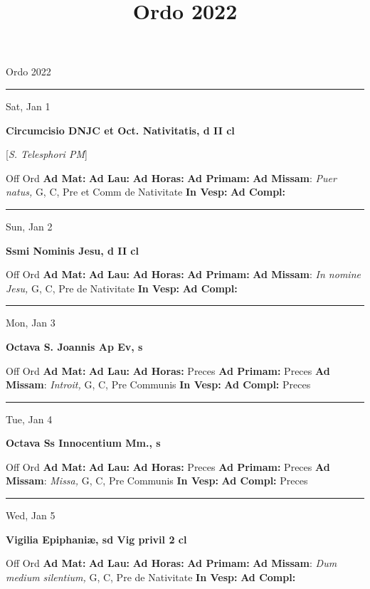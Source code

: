 \documentclass[letterpaper, 10pt]{article}
\title{Ordo 2022}
\begin{document}
\begin{center}
\Huge Ordo 2022\end{center}

\hrule
\begin{center}
Sat, Jan 1
\end{center}\textbf{ \large Circumcisio DNJC et Oct. Nativitatis, \textnormal{\normalsize d II cl}}

[\textit{S. Telesphori PM}]
\begin{justify}
Off Ord
\textbf{Ad Mat: }
\textbf{Ad Lau: }
\textbf{Ad Horas: }
\textbf{Ad Primam: }
\textbf{Ad Missam}: \textit{Puer natus,} G, C, Pre et Comm de Nativitate
\textbf{In Vesp: }
\textbf{Ad Compl: }\end{justify}



\hrule
\begin{center}
Sun, Jan 2
\end{center}\textbf{ \large Ssmi Nominis Jesu, \textnormal{\normalsize d II cl}}
\begin{justify}
Off Ord
\textbf{Ad Mat: }
\textbf{Ad Lau: }
\textbf{Ad Horas: }
\textbf{Ad Primam: }
\textbf{Ad Missam}: \textit{In nomine Jesu,} G, C, Pre de Nativitate
\textbf{In Vesp: }
\textbf{Ad Compl: }\end{justify}



\hrule
\begin{center}
Mon, Jan 3
\end{center}\textbf{ \large Octava S. Joannis Ap Ev, \textnormal{\normalsize s}}
\begin{justify}
Off Ord
\textbf{Ad Mat: }
\textbf{Ad Lau: }
\textbf{Ad Horas: }Preces
\textbf{Ad Primam: }Preces
\textbf{Ad Missam}: \textit{Introit,} G, C, Pre Communis
\textbf{In Vesp: }
\textbf{Ad Compl: }Preces\end{justify}



\hrule
\begin{center}
Tue, Jan 4
\end{center}\textbf{ \large Octava Ss Innocentium Mm., \textnormal{\normalsize s}}
\begin{justify}
Off Ord
\textbf{Ad Mat: }
\textbf{Ad Lau: }
\textbf{Ad Horas: }Preces
\textbf{Ad Primam: }Preces
\textbf{Ad Missam}: \textit{Missa,} G, C, Pre Communis
\textbf{In Vesp: }
\textbf{Ad Compl: }Preces\end{justify}



\hrule
\begin{center}
Wed, Jan 5
\end{center}\textbf{ \large Vigilia Epiphaniæ, \textnormal{\normalsize sd Vig privil 2 cl}}
\begin{justify}
Off Ord
\textbf{Ad Mat: }
\textbf{Ad Lau: }
\textbf{Ad Horas: }
\textbf{Ad Primam: }
\textbf{Ad Missam}: \textit{Dum medium silentium,} G, C, Pre de Nativitate
\textbf{In Vesp: }
\textbf{Ad Compl: }\end{justify}
\end{document}
